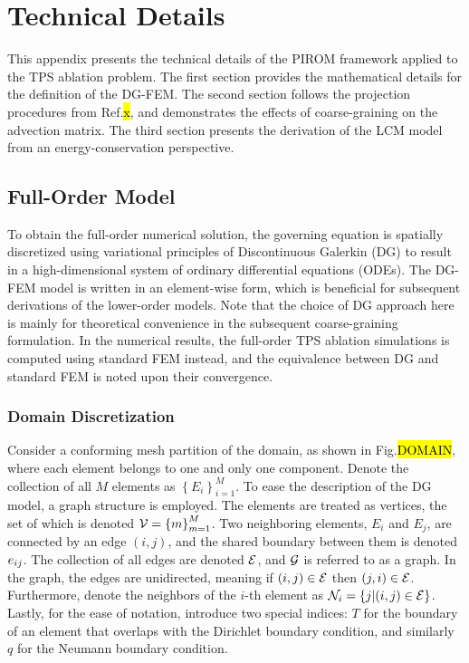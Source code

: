 \newpage\appendix
\section{Technical Details}\label{appendix}

This appendix presents the technical details of the PIROM framework applied to the TPS ablation problem. The first section provides the mathematical details for the definition of the DG-FEM. The second section follows the projection procedures from Ref.\hl{x}, and demonstrates the effects of coarse-graining on the advection matrix. The third section presents the derivation of the LCM model from an energy-conservation perspective.

\subsection{Full-Order Model}

To obtain the full-order numerical solution, the governing equation is spatially discretized using variational principles of Discontinuous Galerkin (DG) to result in a high-dimensional system of ordinary differential equations (ODEs). The DG-FEM model is written in an element-wise form, which is beneficial for subsequent derivations of the lower-order models. Note that the choice of DG approach here is mainly for theoretical convenience in the subsequent coarse-graining formulation. In the numerical results, the full-order TPS ablation simulations is computed using standard FEM instead, and the equivalence between DG and standard FEM is noted upon their convergence.

\subsubsection{Domain Discretization}

Consider a conforming mesh partition of the domain, as shown in Fig.\hl{DOMAIN}, where each element belongs to one and only one component. Denote the collection of all $M$ elements as $\left\{E_i\right\}_{i=1}^{M}$. To ease the description of the DG model, a graph structure is employed. The elements are treated as vertices, the set of which is denoted $\mathcal{V}=\left\{m\right\}_{m=1}^{M}$. Two neighboring elements, $E_i$ and $E_j$, are connected by an edge $(i,j)$, and the shared boundary between them is denoted $e_{ij}$. The collection of all edges are denoted $\mathcal{E}$, and $\mathcal{G}$ is referred to as a graph. In the graph, the edges are unidirected, meaning if $(i,j)\in\mathcal{E}$ then $(j,i)\in\mathcal{E}$. Furthermore, denote the neighbors of the $i$-th element as $\mathcal{N}_i=\left\{j | (i,j) \in\mathcal{E}\right\}$. Lastly, for the ease of notation, introduce two special indices: $T$ for the boundary of an element that overlaps with the Dirichlet boundary condition, and similarly $q$ for the Neumann boundary condition.

